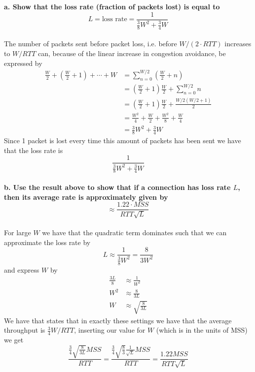 \textbf{a. Show that the loss rate (fraction of packets lost) is equal to}
\begin{equation*}
    L = \text{loss rate} = \frac{1}{\frac{3}{8} W^2 + \frac{3}{4}W}
\end{equation*}
\\
The number of packets sent before packet loss, i.e. before $W/(2 \cdot RTT)$ increases to $W/RTT$ can, because of the linear increase in congestion avoidance, be expressed by 
\begin{equation*}
\begin{split}
    \frac{W}{2}+\left(\frac{W}{2}+1\right)+\cdots+W & =\sum_{n=0}^{W / 2}\left(\frac{W}{2}+n\right) \\
    & =\left(\frac{W}{2}+1\right) \frac{W}{2}+\sum_{n=0}^{W / 2} n \\
    & =\left(\frac{W}{2}+1\right) \frac{W}{2}+\frac{W / 2(W / 2+1)}{2} \\
    & =\frac{W^2}{4}+\frac{W}{2}+\frac{W^2}{8}+\frac{W}{4} \\
    & =\frac{3}{8} W^2+\frac{3}{4} W
\end{split}
\end{equation*} 
Since 1 packet is lost every time this amount of packets has been sent we have that the loss rate is
\begin{equation*}
    \frac{1}{\frac{3}{8} W^2+\frac{3}{4} W}
\end{equation*}
\\
\textbf{b. Use the result above to show that if a connection has loss rate $L$, then its average rate is approximately given by}
\begin{equation*}
    \approx \frac{1.22 \cdot MSS}{RTT \sqrt{L}}
\end{equation*}
\\
For large $W$ we have that the quadratic term dominates such that we can approximate the loss rate by 
\begin{equation*}
    L \approx \frac{1}{\frac{3}{8}W^2} = \frac{8}{3W^2}  
\end{equation*}
and express $W$ by 
\begin{equation*}
\begin{split}
    \frac{3L}{8} &\approx \frac{1}{W^2} \\
    W^2 &\approx \frac{8}{3L} \\
    W &\approx \sqrt{\frac{8}{3L}}
\end{split}
\end{equation*}
We have that \cite{kr} states that in exactly these settings we have that the average throughput is $\frac{3}{4}W/RTT$, inserting our value for $W$ (which is in the units of MSS) we get
\begin{equation*}
    \frac{\frac{3}{4} \sqrt{\frac{8}{3L}} MSS}{RTT} = \frac{\frac{3}{4} \sqrt{\frac{8}{3}} \frac{1}{\sqrt{L}} MSS}{RTT} = \frac{1.22 MSS}{RTT \sqrt{L}}
\end{equation*}



